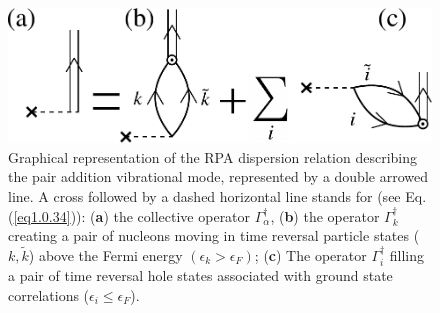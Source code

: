 \begin{figure}
	\centerline {
		\includegraphics*[width=12cm]{introduccion/figs/fig_preface_3_1}
	}
	\caption{Graphical representation of the RPA dispersion relation describing the pair addition  vibrational mode, represented by a double arrowed line.  A cross followed by a dashed horizontal line stands for (see Eq. (\ref{eq1.0.34})): (\textbf{a}) the collective operator $\Gamma_\alpha^\dagger$, (\textbf{b}) the operator $\Gamma_k^\dagger$ creating a pair of nucleons moving in time reversal particle states ($k,\tilde k$) above the Fermi energy $(\epsilon_k>\epsilon_F)$; (\textbf{c}) The operator $\Gamma^\dagger_i$ filling a pair of time reversal hole states associated with ground state correlations ($\epsilon_i\leq\epsilon_F$).}
	\label{fig0.3.1}
\end{figure}
